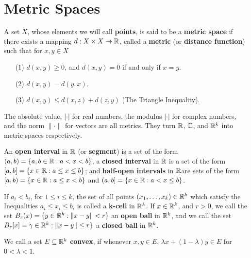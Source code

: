 \section{Metric Spaces}\label{section_2.2}

\begin{definition}
  A set $X$, whose elements we will call \textbf{points}, is said to be a
  \textbf{metric space} if there exists a mapping $d:X \times X \rightarrow \mathbb{R}$,
  called a \textbf{metric} (or \textbf{distance function}) such that for $x,y
  \in X$
  \begin{enumerate}
    \item[(1)] $d(x,y) \geq 0$, and $d(x,y)=0$ if and only if $x=y$.

    \item[(2)] $d(x,y)=d(y,x)$.

    \item[(3)] $d(x,y) \leq d(x,z)+d(z,y)$ (The Triangle Inequality).
  \end{enumerate}
\end{definition}

\begin{example}
  The absolute value, $|\cdot|$ for real numbers, the modulus  $|\cdot|$ for
  complex numbers, and the norm $\|\cdot\|$ for vectors are all metrics. They
  turn  $\mathbb{R}$,  $\mathbb{C}$, and  $\mathbb{R}^k$ into metric spaces respectively.
\end{example}

\begin{definition}
  An \textbf{open interval} in $\mathbb{R}$ (or \textbf{segment}) is a set of the form
  $(a,b)=\{a,b \in \mathbb{R}: a<x<b\}$, a \textbf{closed interval} in $\mathbb{R}$ is a set of
  the form $[a,b]=\{x \in \mathbb{R}: a \leq x \leq b\}$; and \textbf{half-open intervals}
  in $\mathbb{R} $are sets of the form  $[a,b)=\{x \in \mathbb{R}: a \leq x <b\}$ and
  $(a,b]=\{x \in \mathbb{R}: a<x \leq b\}$.

  If  $a_i < b_i$, for  $1 \leq i \leq k$, the set of all points
  $(x_1, \dots, x_k) \in \mathbb{R}^k$ which satisfy the Inequalities $a_i \leq x_i \leq
  b_i$ is called a \textbf{k-cell} in $\mathbb{R}^k$. If $x \in \mathbb{R}^k$, and  $r>0$, we
  call the set  $B_r(x)=\{y \in \mathbb{R}^k: \|x-y\|<r\}$ an \textbf{open ball} in $\mathbb{R}^k$,
  and we call the set  $B_r[x]=\gamma \in \mathbb{R}^k: \|x-y\| \leq r\}$ a
  \textbf{closed ball} in $\mathbb{R}^k$.
\end{definition}

\begin{definition}
  We call a set $E \subseteq \mathbb{R}^k$ \textbf{convex}, if whenever  $x,y \in E$,
  $\lambda x+(1-\lambda)y \in E$ for  $0<\lambda<1$.
\end{definition}

